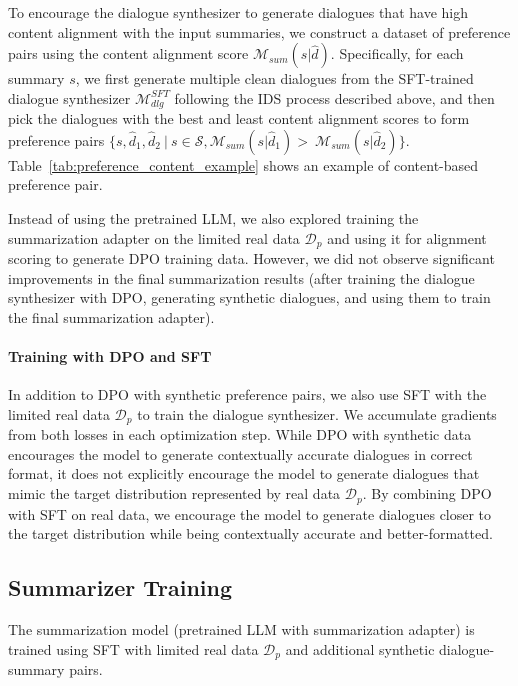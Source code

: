 To encourage the dialogue synthesizer to generate dialogues that have high content alignment with the input summaries, we construct a dataset of preference pairs using the content alignment score $\mathcal{M}_{sum}(s|\hat{d})$. 
Specifically, for each summary $s$, we first generate multiple clean dialogues from the SFT-trained dialogue synthesizer $\mathcal{M}_{dlg}^{SFT}$ following the IDS process described above, and then pick the dialogues with the best and least content alignment scores to form preference pairs $\{s, \hat{d}_1, \hat{d}_2\ |\ s \in \mathcal{S},
\mathcal{M}_{sum}(s|\hat{d}_1) >\  \mathcal{M}_{sum}(s|\hat{d}_2)\}$. Table~\ref{tab:preference_content_example} shows an example of content-based preference pair.

Instead of using the pretrained LLM, we also explored training the summarization adapter on the limited real data $\mathcal{D}_p$ and using it for alignment scoring to generate DPO training data. However, we did not observe significant improvements in the final summarization results (after training the dialogue synthesizer with DPO, generating synthetic dialogues, and using them to train the final summarization adapter).

\paragraph{Training with DPO and SFT}
In addition to DPO with synthetic preference pairs, we also use SFT with the limited real data $\mathcal{D}_p$ to train the dialogue synthesizer. We accumulate gradients from both losses in each optimization step. While DPO with synthetic data encourages the model to generate contextually accurate dialogues in correct format, it does not explicitly encourage the model to generate dialogues that mimic the target distribution represented by real data $\mathcal{D}_p$. By combining DPO with SFT on real data, we encourage the model to generate dialogues closer to the target distribution while being contextually accurate and better-formatted.

\subsection{Summarizer Training}
\label{sec:summ_train}
The summarization model (pretrained LLM with summarization adapter) is trained using SFT with limited real data $\mathcal{D}_p$ and additional synthetic dialogue-summary pairs.

